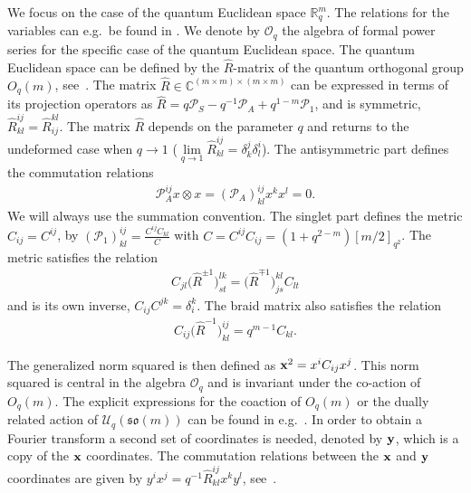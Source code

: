 \documentclass[11pt]{article}
\newcommand{\mR}{\mathbb{R}}
\newcommand{\mC}{\mathbb{C}}
\newcommand{\cP}{\mathcal{P}}
\newcommand{\cO}{\mathcal{O}}
\newcommand{\cU}{\mathcal{U}}
\numberwithin{equation}{section}
\begin{document}
We focus on the case of the quantum Euclidean space $\mR^m_q$. The relations for the variables can e.g.\ be found in \cite{MR1328733, MR2006509, MR1361741}. We denote by $\cO_q$ the algebra of formal power series for the specif\/ic case of the quantum Euclidean space. The quantum Euclidean space can be def\/ined by the $\hat{R}$-matrix of the quantum orthogonal group $O_q(m)$, see~\cite{MR1097174, MR1239953}. The matrix $\hat{R}\in\mC^{(m\times m)\times(m\times m)}$ can be expressed in terms of its projection operators as $\hat{R}=q\cP_S-q^{-1}\cP_A+q^{1-m}\cP_1$, and is symmetric, $\hat{R}^{ij}_{kl}=\hat{R}_{ij}^{kl}$. The matrix $\hat{R}$ depends on the parameter $q$ and returns to the undeformed case when $q\to1$ ($\lim\limits_{q\to1}\hat{R}^{ij}_{kl}=\delta^j_k\delta^i_l$). The antisymmetric part def\/ines the commutation relations
\begin{gather*}
\cP_A^{ij}x\otimes x=\left(\cP_A\right)^{ij}_{kl}x^kx^l = 0.
\end{gather*}
We will always use the summation convention. The singlet part def\/ines the metric $C_{ij}=C^{ij}$, by $\left(\cP_1\right)^{ij}_{kl}=\frac{C^{ij}C_{kl}}{C}$ with $C=C^{ij}C_{ij}=(1+q^{2-m})[m/2]_{q^2}$. The metric satisf\/ies the relation
\begin{gather}
\label{CR}
C_{jl}\big(\hat{R}^{\pm 1}\big)^{lk}_{st} = \big(\hat{R}^{\mp 1}\big)^{kl}_{js}C_{lt}
\end{gather}
and is its own inverse, $C_{ij}C^{jk}=\delta^k_i$. The braid matrix also satisf\/ies the relation
\begin{gather}
\label{CR2}
C_{ij}\big(\hat{R}^{-1}\big)^{ij}_{kl} = q^{m-1}C_{kl}.
\end{gather}

The generalized norm squared is then def\/ined as $\bold{x}^2=x^iC_{ij}x^j$. This norm squared is central in the algebra $\cO_q$ and is invariant under the co-action of $O_q(m)$. The explicit expressions for the coaction of $O_q(m)$ or the dually related action of $\cU_q(\mathfrak{so}(m))$ can be found in e.g.~\cite{MR1138053, MR1239953, MR1328733, MR2006509}. In order to obtain a Fourier transform a second set of coordinates is needed, denoted by $\bold{y}$, which is a copy of the $\bold{x}$ coordinates. The commutation relations between the $\bold{x}$ and $\bold{y}$ coordinates are given by $y^ix^j=q^{-1}\hat{R}^{ij}_{kl}x^ky^l$, see~\cite{MR1303081, MR1235979, MR1317458}.
\end{document}
